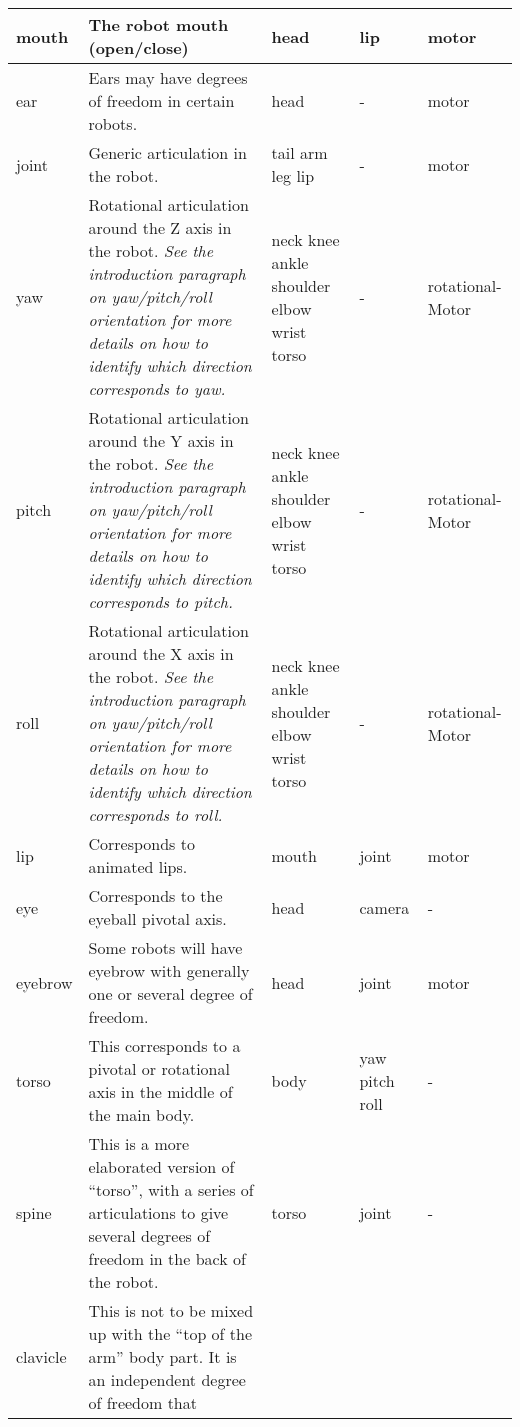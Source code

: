\documentclass[a4paper]{article}
\begin{document}
\begin{center}
\begin{supertabular}{|m{2.312cm}|m{6.776cm}|m{2.629cm}|m{2.471cm}|m{2.1269999cm}|}
mouth &
\sffamily The robot mouth (open/close) &
\ttfamily head &
\ttfamily lip &
\ttfamily motor\\\hline
ear &
\sffamily Ears may have degrees of freedom in
certain robots. &
\ttfamily head &
\ttfamily {}- &
\ttfamily motor\\\hline
joint &
\sffamily Generic articulation in the robot. &
\ttfamily tail arm leg lip &
\ttfamily {}- &
\ttfamily motor\\\hline
yaw &
\sffamily Rotational articulation around the Z
axis in the robot. \textit{See the introduction paragraph on
yaw/pitch/roll orientation for more details on how to identify which
direction corresponds to yaw.} &
\ttfamily neck knee ankle shoulder elbow wrist
torso &
\ttfamily {}- &
\ttfamily rotational-Motor\\\hline
pitch &
\sffamily Rotational articulation around the Y
axis in the robot. \textit{See the introduction paragraph on
yaw/pitch/roll orientation for more details on how to identify which
direction corresponds to pitch.} &
\ttfamily neck knee ankle shoulder elbow wrist
torso &
\ttfamily {}- &
\ttfamily rotational-Motor\\\hline
roll &
\sffamily Rotational articulation around the X
axis in the robot. \textit{See the introduction paragraph on
yaw/pitch/roll orientation for more details on how to identify which
direction corresponds to roll.} &
\ttfamily neck knee ankle shoulder elbow wrist
torso &
\ttfamily {}- &
\ttfamily rotational-Motor\\\hline
lip &
\sffamily Corresponds to animated lips. &
\ttfamily mouth &
\ttfamily joint &
\ttfamily motor\\\hline
eye &
\sffamily Corresponds to the eyeball pivotal
axis. &
\ttfamily head &
\ttfamily camera &
\ttfamily {}-\\\hline
eyebrow &
\sffamily Some robots will have eyebrow with
generally one or several degree of freedom. &
\ttfamily head &
\ttfamily joint &
\ttfamily motor\\\hline
torso &
\sffamily This corresponds to a pivotal or
rotational axis in the middle of the main body. &
\ttfamily body &
\ttfamily yaw pitch roll &
\ttfamily {}-\\\hline
spine &
\sffamily This is a more elaborated version of
“torso”, with a series of articulations to give several degrees of
freedom in the back of the robot. &
\ttfamily torso &
\ttfamily joint &
\ttfamily {}-\\\hline
clavicle &
\sffamily This is not to be mixed up with the
“top of the arm” body part. It is an independent degree of freedom that

\end{supertabular}
\end{center}
\end{document}
